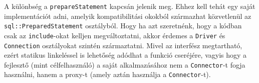 A különbség a \texttt{prepareStatement} kapcsán jelenik meg. Ehhez kell tehát egy saját implementációt adni, amelyik kompatibilitási okokból származhat közvetlenül az \texttt{sql::PreparedStatement} osztályból. Hogy ha azt szeretnénk, hogy a kódban csak az \texttt{include}-okat kelljen megváltoztatni, akkor érdemes a \texttt{Driver} és \texttt{Connection} osztályokat szintén származtatni. Mivel az interfész megtartható, ezért statikus linkeléssel is lehetőség adódhat a funkció cseréjére, vagyis hogy a fejlesztő (mint célfelhasználó) a saját alkalmazásához nem a \texttt{Connector}-t fogja használni, hanem a proxy-t (amely aztán használja a \texttt{Connector}-t).
